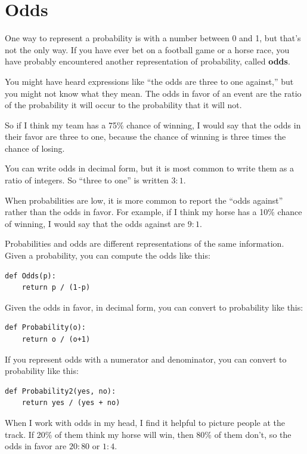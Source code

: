 \documentclass[12pt]{book}
\begin{document}
\section{Odds}

One way to represent a probability is with a number between
0 and 1, but that's not the only way.  If you have ever bet
on a football game or a horse race, you have probably encountered
another representation of probability, called {\bf odds}.

You might have heard expressions like ``the odds are
three to one against,'' but you might not know what they mean.  
The odds in favor of an event are the ratio of the probability
it will occur to the probability that it will not.

So if I think my team has a 75\% chance of winning, I would
say that the odds in their favor are three to one, because
the chance of winning is three times the chance of losing.

You can write odds in decimal form, but it is most common to
write them as a ratio of integers.  So ``three to one'' is
written $3:1$.

When probabilities are low, it is more common to report the
``odds against'' rather than the odds in favor.  For
example, if I think my horse has a 10\% chance of winning,
I would say that the odds against are $9:1$.

Probabilities and odds are different representations of the
same information.  Given a probability, you can compute the
odds like this:

\begin{verbatim}
def Odds(p):
    return p / (1-p)
\end{verbatim}

Given the odds in favor, in decimal form, you can convert to
probability like this:

\begin{verbatim}
def Probability(o):
    return o / (o+1)
\end{verbatim}

If you represent odds with a numerator and denominator, you
can convert to probability like this:

\begin{verbatim}
def Probability2(yes, no):
    return yes / (yes + no)
\end{verbatim}

When I work with odds in my head, I find it helpful to picture
people at the track.  If 20\% of them think my horse will win,
then 80\% of them don't, so the odds in favor are $20:80$ or
$1:4$.
\end{document}
